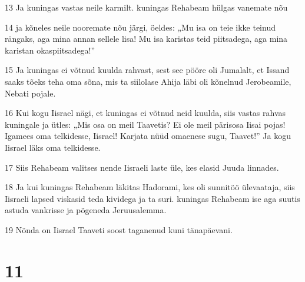 \par 13 Ja kuningas vastas neile karmilt. kuningas Rehabeam hülgas vanemate nõu
\par 14 ja kõneles neile nooremate nõu järgi, öeldes: „Mu isa on teie ikke teinud rängaks, aga mina annan sellele lisa! Mu isa karistas teid piitsadega, aga mina karistan okaspiitsadega!”
\par 15 Ja kuningas ei võtnud kuulda rahvast, sest see pööre oli Jumalalt, et Issand saaks tõeks teha oma sõna, mis ta siilolase Ahija läbi oli kõnelnud Jerobeamile, Nebati pojale.
\par 16 Kui kogu Iisrael nägi, et kuningas ei võtnud neid kuulda, siis vastas rahvas kuningale ja ütles: „Mis osa on meil Taavetis? Ei ole meil pärisosa Iisai pojas! Igamees oma telkidesse, Iisrael! Karjata nüüd omaenese sugu, Taavet!” Ja kogu Iisrael läks oma telkidesse.
\par 17 Siis Rehabeam valitses nende Iisraeli laste üle, kes elasid Juuda linnades.
\par 18 Ja kui kuningas Rehabeam läkitas Hadorami, kes oli sunnitöö ülevaataja, siis Iisraeli lapsed viskasid teda kividega ja ta suri. kuningas Rehabeam ise aga suutis astuda vankrisse ja põgeneda Jeruusalemma.
\par 19 Nõnda on Iisrael Taaveti soost taganenud kuni tänapäevani.

\chapter{11}

